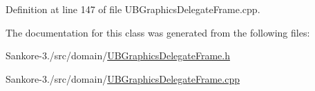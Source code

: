 Definition at line 147 of file U\-B\-Graphics\-Delegate\-Frame.\-cpp.



The documentation for this class was generated from the following files\-:\begin{DoxyCompactItemize}
\item 
Sankore-\/3./src/domain/\hyperlink{_u_b_graphics_delegate_frame_8h}{U\-B\-Graphics\-Delegate\-Frame.\-h}\item 
Sankore-\/3./src/domain/\hyperlink{_u_b_graphics_delegate_frame_8cpp}{U\-B\-Graphics\-Delegate\-Frame.\-cpp}\end{DoxyCompactItemize}
